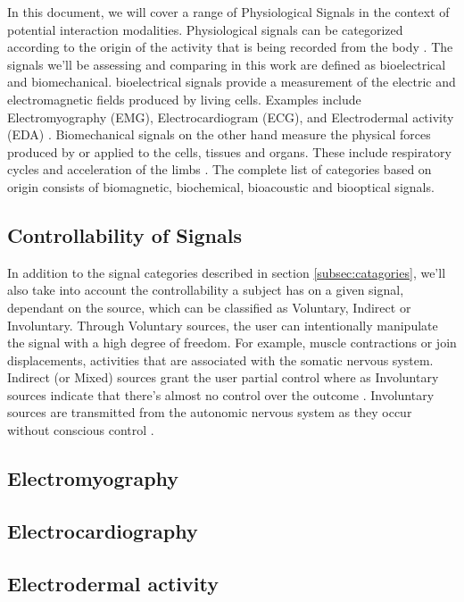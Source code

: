In this document, we will cover a range of Physiological Signals in the context of potential interaction modalities. Physiological signals can be categorized according to the origin of the activity that is being recorded from the body \cite{enderle_introduction_2012}. The signals we'll be assessing and comparing in this work are defined as bioelectrical and biomechanical. bioelectrical signals provide a measurement of the electric and electromagnetic fields produced by living cells. Examples include Electromyography (EMG), Electrocardiogram (ECG), and Electrodermal activity (EDA) \cite{malmivuo_bioelectromagnetismprinciples_1995}. Biomechanical signals on the other hand measure the physical forces produced by or applied to the cells, tissues and organs. These include respiratory cycles and acceleration of the limbs \cite{guerreiro_bitalino_2013, pacelli_sensing_2006}. The complete list of categories based on origin consists of biomagnetic, biochemical, bioacoustic and biooptical signals.   

\subsection{Controllability of Signals}

In addition to the signal categories described in section \ref{subsec:catagories}, we'll also take into account the controllability a subject has on a given signal, dependant on the source, which can be classified as Voluntary, Indirect or Involuntary. Through Voluntary sources, the user can intentionally manipulate the signal with a high degree of freedom. For example, muscle contractions or join displacements, activities that are associated with the somatic nervous system. Indirect (or Mixed) sources grant the user partial control where as Involuntary sources indicate that there's almost no control over the outcome \cite{da_silva_biosignal_2017}. Involuntary sources are transmitted from the autonomic nervous system as they occur without conscious control \cite{lenman_human_1975}.

\subsection{Electromyography}

\subsection{Electrocardiography}

\subsection{Electrodermal activity}

